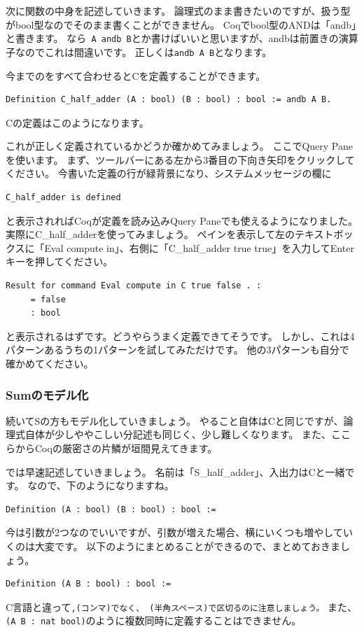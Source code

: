 \documentclass{jsbook}
\begin{document}
次に関数の中身を記述していきます。
論理式のまま書きたいのですが、扱う型がbool型なのでそのまま書くことができません。
Coqでbool型のANDは「andb」と書きます。
なら\verb| A andb B|とか書けばいいと思いますが、andbは前置きの演算子なのでこれは間違いです。
正しくは\verb|andb A B|となります。

今までのをすべて合わせるとCを定義することができます。
\begin{verbatim}
Definition C_half_adder (A : bool) (B : bool) : bool := andb A B.
\end{verbatim}
Cの定義はこのようになります。

これが正しく定義されているかどうか確かめてみましょう。
ここでQuery Paneを使います。
まず、ツールバーにある左から3番目の下向き矢印をクリックしてください。
今書いた定義の行が緑背景になり、システムメッセージの欄に
\begin{verbatim}
C_half_adder is defined
\end{verbatim}
と表示されればCoqが定義を読み込みQuery Paneでも使えるようになりました。
実際にC\_half\_adderを使ってみましょう。
ペインを表示して左のテキストボックスに「Eval compute in」、右側に「C\_half\_adder true true」を入力してEnterキーを押してください。

\begin{verbatim}
Result for command Eval compute in C true false . :
     = false
     : bool
\end{verbatim}
と表示されるはずです。どうやらうまく定義できてそうです。
しかし、これは4パターンあるうちの1パターンを試してみただけです。
他の3パターンも自分で確かめてください。

\subsubsection*{Sumのモデル化}
続いてSの方もモデル化していきましょう。
やること自体はCと同じですが、論理式自体が少しややこしい分記述も同じく、少し難しくなります。
また、ここらからCoqの厳密さの片鱗が垣間見えてきます。

では早速記述していきましょう。
名前は「S\_half\_adder」、入出力はCと一緒です。
なので、下のようになりますね。
\begin{verbatim}
Definition (A : bool) (B : bool) : bool :=
\end{verbatim}
今は引数が2つなのでいいですが、引数が増えた場合、横にいくつも増やしていくのは大変です。
以下のようにまとめることができるので、まとめておきましょう。
\begin{verbatim}
Definition (A B : bool) : bool :=
\end{verbatim}
C言語と違って\verb*|,(コンマ)でなく、 (半角スペース)で区切るのに注意しましょう。|
また、\verb|(A B : nat bool)|のように複数同時に定義することはできません。
\end{document}
